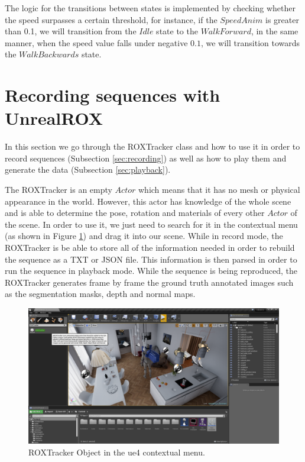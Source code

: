 The logic for the transitions between states is implemented by checking whether the speed surpasses a certain threshold, for instance, if the $Speed Anim$ is greater than 0.1, we will transition from the $Idle$ state to the $WalkForward$, in the same manner, when the speed value falls under negative $0.1$, we will transition towards the $WalkBackwards$ state.

\section{Recording sequences with UnrealROX}
\label{sec:tracker}
In this section we go through the ROXTracker class and how to use it in order to record sequences (Subsection \ref{sec:recording}) as well as how to play them and generate the data (Subsection \ref{sec:playback}).

The ROXTracker is an empty $Actor$ which means that it has no mesh or physical appearance in the world. However, this actor has knowledge of the whole scene and is able to determine the pose, rotation and materials of every other $Actor$ of the scene. In order to use it, we just need to search for it in the contextual menu (as shown in Figure \ref{fig:tracker_object}) and drag it into our scene. While in record mode, the ROXTracker is be able to store all of the information needed in order to rebuild the sequence as a TXT or JSON file. This information is then parsed in order to run the sequence in playback mode. While the sequence is being reproduced, the ROXTracker generates frame by frame the ground truth annotated images such as the segmentation masks, depth and normal maps.

\begin{figure}[h]
	\includegraphics[width=\textwidth]{archivos/tracker_object.png}
	\centering
	\caption{ROXTracker Object in the \gls{ue4} contextual menu.}
	\label{fig:tracker_object}
\end{figure}

